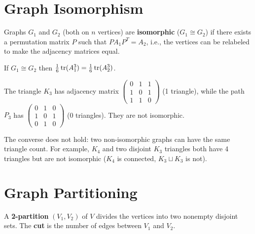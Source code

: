\section{Graph Isomorphism}

\begin{definition}[Isomorphism]
Graphs $G_1$ and $G_2$ (both on $n$ vertices) are \textbf{isomorphic} ($G_1\cong G_2$) if there exists a permutation matrix $P$ such that $PA_1P^T=A_2$, i.e., the vertices can be relabeled to make the adjacency matrices equal.
\end{definition}

\begin{theorem}
If $G_1\cong G_2$ then $\tfrac{1}{6}\operatorname{tr}(A_1^3)=\tfrac{1}{6}\operatorname{tr}(A_2^3)$.
\end{theorem}

\begin{example}
The triangle $K_3$ has adjacency matrix $\begin{pmatrix}0&1&1\\1&0&1\\1&1&0\end{pmatrix}$ (1 triangle), while the path $P_3$ has $\begin{pmatrix}0&1&0\\1&0&1\\0&1&0\end{pmatrix}$ (0 triangles). They are not isomorphic.
\end{example}

\begin{remark}
The converse does not hold: two non-isomorphic graphs can have the same triangle count. For example, $K_4$ and two disjoint $K_3$ triangles both have 4 triangles but are not isomorphic ($K_4$ is connected, $K_3\sqcup K_3$ is not).
\end{remark}

\section{Graph Partitioning}

\begin{definition}
A \textbf{2-partition} $(V_1,V_2)$ of $V$ divides the vertices into two nonempty disjoint sets. The \textbf{cut} is the number of edges between $V_1$ and $V_2$.
\end{definition}

